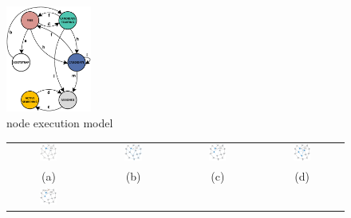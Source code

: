 \begin{figure}
  \centering
    \includegraphics[width=0.25\textwidth]{pictures/dbs_updated.eps}
  \caption{\disr{} node execution model}
  \label{fig:state_machine}
\end{figure}

\begin{figure}
\centering
\begin{tabular}{cccc}
\includegraphics[width=0.23\textwidth]{pictures/seq01.eps} & 
\includegraphics[width=0.23\textwidth]{pictures/seq02.eps} &
\includegraphics[width=0.23\textwidth]{pictures/seq03.eps} & 
\includegraphics[width=0.23\textwidth]{pictures/seq04.eps} \\
(a) & (b) & (c) & (d) \\
\includegraphics[width=0.23\textwidth]{pictures/seq05.eps} &

\end{tabular}
\end{figure}
